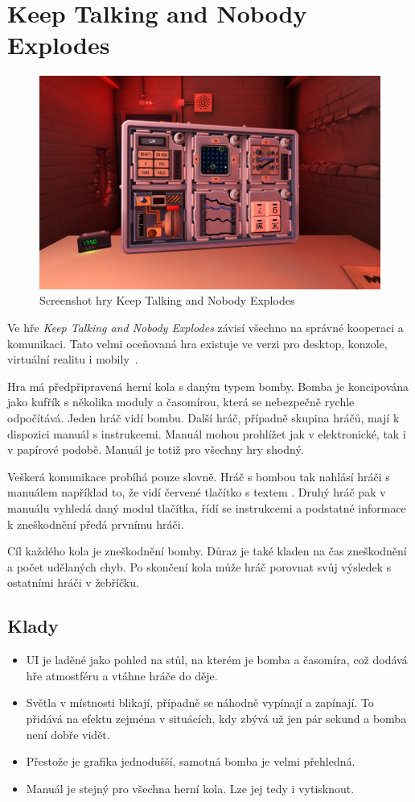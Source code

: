 \section{Keep Talking and Nobody Explodes}

\begin{figure}
    \centering
    \includegraphics[width=0.5\linewidth]{assets/competitive-apps/keep-talking.jpg}
    \caption{Screenshot hry Keep Talking and Nobody Explodes~\cite{steelcrategamesinc_keep_talking}}
    \label{fig:keep-talking}
\end{figure}

Ve hře \emph{Keep Talking and Nobody Explodes} závisí všechno na správné
kooperaci a komunikaci.
Tato velmi oceňovaná hra existuje ve verzi pro desktop, konzole,
virtuální realitu i mobily~\cite{steelcrategamesinc_keep_talking}.

Hra má předpřipravená herní kola s daným typem bomby.
Bomba je koncipována jako kufřík s několika moduly a časomírou,
která se nebezpečně rychle odpočítává.
Jeden hráč vidí bombu.
Další hráč, případně skupina hráčů, mají k dispozici manuál s instrukcemi.
Manuál mohou prohlížet jak v elektronické, tak i v papírové podobě.
Manuál je totiž pro všechny hry shodný.

Veškerá komunikace probíhá pouze slovně.
Hráč s bombou tak nahlásí hráči s manuálem například to,
že vidí červené tlačítko s textem .
Druhý hráč pak v manuálu vyhledá daný modul tlačítka, řídí se instrukcemi a
podstatné informace k zneškodnění předá prvnímu hráči.

Cíl každého kola je zneškodnění bomby.
Důraz je také kladen na čas zneškodnění a počet udělaných chyb.
Po skončení kola může hráč porovnat svůj výsledek s ostatními hráči v žebříčku.

\subsection*{Klady}

\begin{itemize}
    \item UI je laděné jako pohled na stůl, na kterém je bomba a časomíra,
    což dodává hře atmostféru a vtáhne hráče do děje.
    \item Světla v místnosti blikají, případně se náhodně vypínají a zapínají.
    To přidává na efektu zejména v situácích,
    kdy zbývá už jen pár sekund a bomba není dobře vidět.
    \item Přestože je grafika jednodušší, samotná bomba je velmi přehledná.
    \item Manuál je stejný pro všechna herní kola. Lze jej tedy i vytisknout.
\end{itemize}

